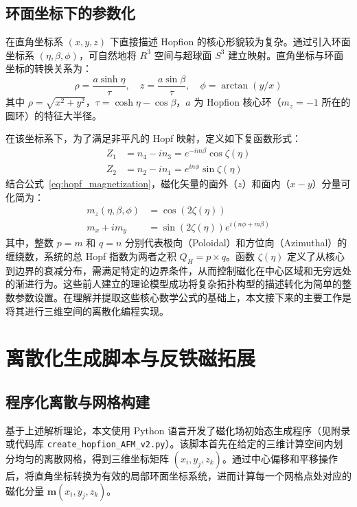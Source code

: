 \subsection{环面坐标下的参数化}
在直角坐标系 $(x,y,z)$ 下直接描述 Hopfion 的核心形貌较为复杂。通过引入环面坐标系 $(\eta, \beta, \phi)$，可自然地将 $R^3$ 空间与超球面 $S^3$ 建立映射。直角坐标与环面坐标的转换关系为：
\begin{equation}
    \rho = \frac{a \sinh \eta}{\tau}, \quad z = \frac{a \sin \beta}{\tau}, \quad \phi = \arctan(y/x)
\end{equation}
其中 $\rho = \sqrt{x^2+y^2}$，$\tau = \cosh \eta - \cos \beta$，$a$ 为 Hopfion 核心环（$m_z=-1$ 所在的圆环）的特征大半径。

在该坐标系下，为了满足非平凡的 Hopf 映射，定义如下复函数形式：
\begin{align}
    Z_1 &= n_4 - i n_3 = e^{-im\beta} \cos \zeta(\eta) \\
    Z_2 &= n_2 - i n_1 = e^{in\phi} \sin \zeta(\eta)
\end{align}
结合公式~\eqref{eq:hopf_magnetization}，磁化矢量的面外（$z$）和面内（$x-y$）分量可化简为：
\begin{align}
    m_z(\eta, \beta, \phi) &= \cos(2\zeta(\eta)) \\
    m_x + i m_y &= \sin(2\zeta(\eta)) e^{i(n\phi + m\beta)}
\end{align}
其中，整数 $p=m$ 和 $q=n$ 分别代表极向（Poloidal）和方位向（Azimuthal）的缠绕数，系统的总 Hopf 指数为两者之积 $Q_H = p \times q$。函数 $\zeta(\eta)$ 定义了从核心到边界的衰减分布，需满足特定的边界条件，从而控制磁化在中心区域和无穷远处的渐进行为。这些前人建立的理论模型成功将复杂拓扑构型的描述转化为简单的整数参数设置。在理解并提取这些核心数学公式的基础上，本文接下来的主要工作是将其进行三维空间的离散化编程实现。

\section{离散化生成脚本与反铁磁拓展}

\subsection{程序化离散与网格构建}
基于上述解析理论，本文使用 Python 语言开发了磁化场初始态生成程序（见附录或代码库 \texttt{create\_hopfion\_AFM\_v2.py}）。该脚本首先在给定的三维计算空间内划分均匀的离散网格，得到三维坐标矩阵 $(x_i, y_j, z_k)$。通过中心偏移和平移操作后，将直角坐标转换为有效的局部环面坐标系统，进而计算每一个网格点处对应的磁化分量 $\mathbf{m}(x_i, y_j, z_k)$。


